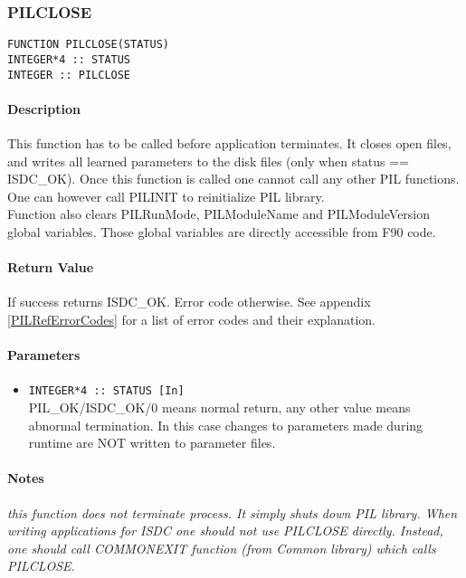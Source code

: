 
\subsubsection{PILCLOSE}

\begin{verbatim}
FUNCTION PILCLOSE(STATUS) 
INTEGER*4 :: STATUS 
INTEGER :: PILCLOSE 
\end{verbatim}

\paragraph{Description\\}
This function has to be called before application terminates. It closes open
files, and writes all learned
parameters to the disk files (only when status == ISDC\_OK). Once this
function is called one cannot call any
other PIL functions. One can however call PILINIT to reinitialize PIL
library. \\
Function also clears PILRunMode, PILModuleName and PILModuleVersion global
variables. Those global variables
are directly accessible from F90 code. 

\paragraph{Return Value\\}
If success returns ISDC\_OK. Error code otherwise. See appendix \ref{PILRefErrorCodes}
for a list of error codes and their explanation.

\paragraph{Parameters}
\begin{itemize}
\item
{\tt INTEGER*4 :: STATUS [In] } \\
PIL\_OK/ISDC\_OK/0 means normal return, any other value means abnormal
termination. In this case changes to parameters made during runtime
are NOT written to parameter files. 
\end{itemize}

\paragraph{Notes\\}
{\it
this function does not terminate process. It simply shuts down PIL library.
When writing applications for
ISDC one should not use PILCLOSE directly. Instead, one should call
COMMONEXIT function (from Common
library) which calls PILCLOSE. 
}

